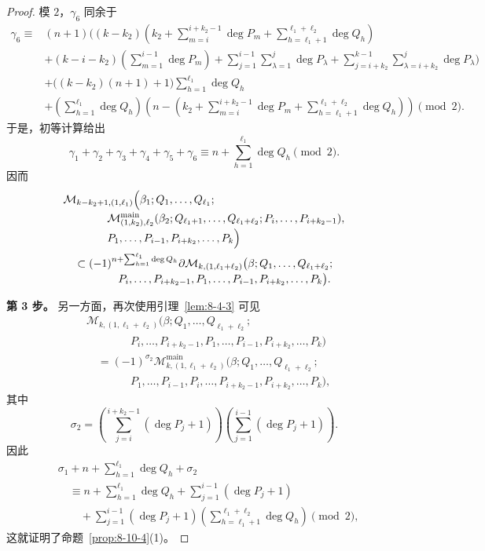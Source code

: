 \begin{proof}
模 $2$，$\gamma_6$ 同余于
\begingroup
\small
\[
\begin{aligned}
\gamma_6\equiv{}&(n+1)\Bigg(
(k-k_2)\left(k_2+
\sum_{m=i}^{i+k_2-1}\deg P_m
+\sum_{h=\ell_1+1}^{\ell_1+\ell_2}\deg Q_h\right)\\
&+(k-i-k_2)\left(\sum_{m=1}^{i-1}\deg P_m\right)
+\sum_{j=1}^{i-1}\sum_{\lambda=1}^{j}\deg P_\lambda
+\sum_{j=i+k_2}^{k-1}\sum_{\lambda=i+k_2}^{j}\deg P_\lambda
\Bigg)\\
&+\bigl((k-k_2)(n+1)+1\bigr)
\sum_{h=1}^{\ell_1}\deg Q_h\\
&+\left(\sum_{h=1}^{\ell_1}\deg Q_h\right)
\left(n-\left(k_2+
\sum_{m=i}^{i+k_2-1}\deg P_m
+\sum_{h=\ell_1+1}^{\ell_1+\ell_2}\deg Q_h\right)\right)
\pmod2.
\end{aligned}
\]
\endgroup
于是，初等计算给出
\[
 \gamma_1+\gamma_2+\gamma_3+\gamma_4+\gamma_5+\gamma_6
 \equiv n+\sum_{h=1}^{\ell_1}\deg Q_h\pmod2.
\]
因而
\[
\begin{aligned}
&\mathcal M_{k-k_2+1,(1,\ell_1)}
\Bigl(\beta_1;Q_1,\ldots,Q_{\ell_1};\\[-2pt]
&\hspace{4em}{}
\mathcal M_{(1,k_2),\ell_2}^{\mathrm{main}}
(\beta_2;Q_{\ell_1+1},\ldots,Q_{\ell_1+\ell_2};
P_i,\ldots,P_{i+k_2-1}),\\[-2pt]
&\hspace{4em}{}
P_1,\ldots,P_{i-1},P_{i+k_2},\ldots,P_k\Bigr)\\
&\quad\subset
(-1)^{n+\sum_{h=1}^{\ell_1}\deg Q_h}
\partial\mathcal M_{k,(1,\ell_1+\ell_2)}
\bigl(\beta;Q_1,\ldots,Q_{\ell_1+\ell_2};\\[-2pt]
&\hspace{5em}{}
P_i,\ldots,P_{i+k_2-1},P_1,\ldots,P_{i-1},
P_{i+k_2},\ldots,P_k\bigr).
\end{aligned}
\]

\par\smallskip\noindent\textbf{第 3 步。}
另一方面，再次使用引理~\ref{lem:8-4-3} 可见
\[
\begin{aligned}
&\mathcal M_{k,(1,\ell_1+\ell_2)}
(\beta;Q_1,\ldots,Q_{\ell_1+\ell_2};\\[-2pt]
&\hspace{4em}{}
P_i,\ldots,P_{i+k_2-1},P_1,\ldots,P_{i-1},
P_{i+k_2},\ldots,P_k)\\
&\quad={}
(-1)^{\sigma_2}
\mathcal M_{k,(1,\ell_1+\ell_2)}^{\mathrm{main}}
(\beta;Q_1,\ldots,Q_{\ell_1+\ell_2};\\[-2pt]
&\hspace{4em}{}
P_1,\ldots,P_{i-1},P_i,\ldots,P_{i+k_2-1},
P_{i+k_2},\ldots,P_k),
\end{aligned}
\]
其中
\[
 \sigma_2=\left(\sum_{j=i}^{i+k_2-1}(\deg P_j+1)\right)
 \left(\sum_{j=1}^{i-1}(\deg P_j+1)\right).
\]
因此
\[
\begin{aligned}
&\sigma_1+n+\sum_{h=1}^{\ell_1}\deg Q_h+\sigma_2\\
&\quad\equiv n+\sum_{h=1}^{\ell_1}\deg Q_h
+\sum_{j=1}^{i-1}(\deg P_j+1)\\
&\qquad{}+
\sum_{j=1}^{i-1}(\deg P_j+1)
\left(\sum_{h=\ell_1+1}^{\ell_1+\ell_2}\deg Q_h\right)
\pmod2,
\end{aligned}
\]
这就证明了命题~\ref{prop:8-10-4}(1)。


\end{proof}
